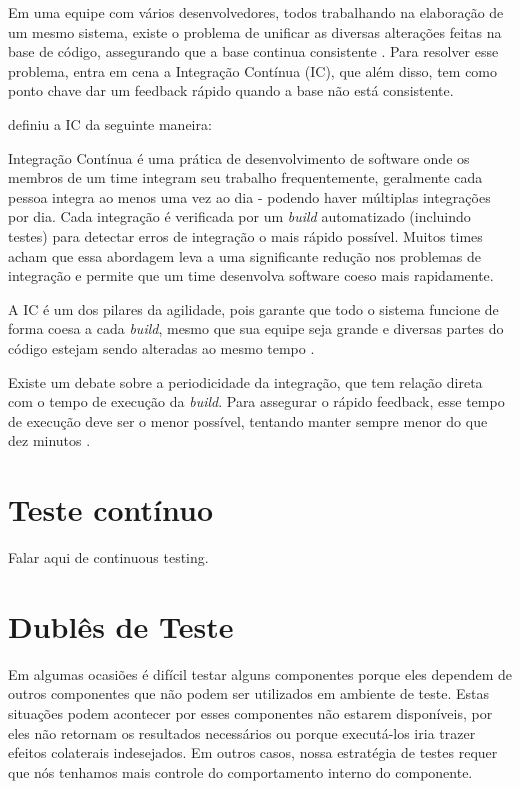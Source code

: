 Em uma equipe com vários desenvolvedores, todos trabalhando na elaboração de um mesmo sistema, existe o problema de unificar as diversas alterações feitas na base de código, assegurando que a base continua consistente \cite{ImproveitCI}. Para resolver esse problema, entra em cena a Integração Contínua (IC), que além disso, tem como ponto chave dar um feedback rápido quando a base não está consistente.

\cite{FowlerCI} definiu a IC da seguinte maneira:

\begin{citacao}
Integração Contínua é uma prática de desenvolvimento de software onde os membros de um time integram seu trabalho frequentemente, geralmente cada pessoa integra ao menos uma vez ao dia - podendo haver múltiplas integrações por dia. Cada integração é verificada por um \textit{build} automatizado (incluindo testes) para detectar erros de integração o mais rápido possível. Muitos times acham que essa abordagem leva a uma significante redução nos problemas de integração e permite que um time desenvolva software coeso mais rapidamente.
\end{citacao}

A IC é um dos pilares da agilidade, pois garante que todo o sistema funcione de forma coesa a cada \textit{build}, mesmo que sua equipe seja grande e diversas partes do código estejam sendo alteradas ao mesmo tempo \cite{CaelumCI}.

Existe um debate sobre a periodicidade da integração, que tem relação direta com o tempo de execução da \textit{build}. Para assegurar o rápido feedback, esse tempo de execução deve ser o menor possível, tentando manter sempre menor do que dez minutos \cite{FowlerCI}.

\section{Teste contínuo}
\label{sub:teste_continuo}

Falar aqui de continuous testing.

\section{Dublês de Teste}

Em algumas ocasiões é difícil testar alguns componentes porque eles dependem de outros componentes que não podem ser utilizados em ambiente de teste. Estas situações podem acontecer por esses componentes não estarem disponíveis, por eles não retornam os resultados necessários ou porque executá-los iria trazer efeitos colaterais indesejados. Em outros casos, nossa estratégia de testes requer que nós tenhamos mais controle do comportamento interno do componente.

